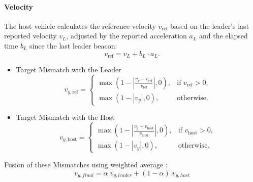 \documentclass[letterpaper, 10pt, conference]{ieeeconf}  %
\begin{document}
\paragraph{Velocity} The host vehicle calculates the reference velocity $v_\text{ref}$ based on the leader's last reported velocity $v_L$, adjusted by the reported acceleration $a_L$ and the elapsed time $b_L$ since the last leader beacon:
\begin{equation}
    v_\text{ref} = v_L + b_L \cdot a_L.
\end{equation}

\begin{itemize}
    \item Target Mismatch with the Leader
        \begin{equation}
        v_{y,\text{ref}} = 
        \begin{cases} 
            \max\left(1 - \left|\frac{v_y - v_\text{ref}}{v_\text{ref}}\right|, 0\right), & \text{if } v_\text{ref} > 0, \\
            \max\left(1 - |v_y|, 0\right), & \text{otherwise}.
        \end{cases}
    \end{equation}
    \item Target Mismatch with the Host
        \begin{equation}
            v_{y,\text{host}} = 
            \begin{cases} 
                \max\left(1 - \left|\frac{v_y - v_\text{host}}{v_\text{host}}\right|, 0\right), & \text{if } v_\text{host} > 0, \\
                \max\left(1 - |v_y|, 0\right), & \text{otherwise}.
            \end{cases}
        \end{equation}
\end{itemize}
Fusion of these Mismatches using weighted average :
\begin{equation}
    v_{y,final} = \alpha. v_{y,leader} + (1-\alpha). v_{y,host}     
\end{equation}
\end{document}
